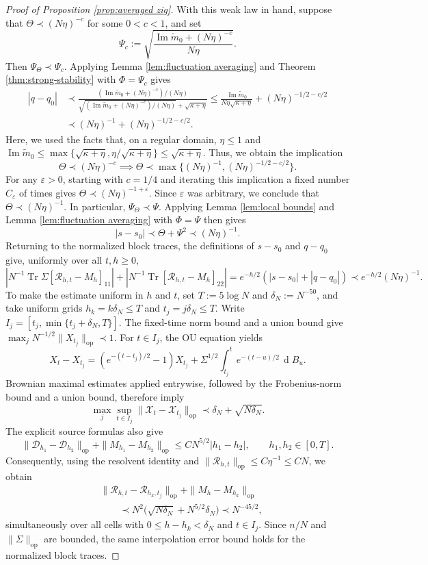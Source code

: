 \documentclass[11pt,reqno]{amsart}
\def\cX{\mathcal{X}}
\def\cR{\mathcal{R}}
\def\cD{\mathcal{D}}
\def\de{\operatorname{d}}
\def\Im{\operatorname{Im}}
\def\op{\mathrm{op}}
\def\eps{\varepsilon}
\def\Tr{\operatorname{Tr}}
\theoremstyle{definition}
\numberwithin{equation}{section}
\numberwithin{figure}{section}
\begin{document}
\begin{proof}[Proof of Proposition \ref{prop:averaged zig}]
With this weak law in hand, suppose that $\Theta\prec (N\eta)^{-c}$ for some $0<c<1$, and set
\[
    \Psi_c:=\sqrt{\frac{\Im\widetilde m_0+(N\eta)^{-c}}{N\eta}}.
\]
Then $\Psi_\Theta\prec\Psi_c$. Applying Lemma \ref{lem:fluctuation averaging} and Theorem \ref{thm:strong-stability} with $\Phi=\Psi_c$ gives
\begin{align*}
    |q-q_0|&\prec \frac{(\Im\widetilde m_0+(N\eta)^{-c})/(N\eta)}{\sqrt{(\Im\widetilde m_0+(N\eta)^{-c})/(N\eta)}+\sqrt{\kappa+\eta}}\leq \frac{\Im\widetilde m_0}{N\eta\sqrt{\kappa+\eta}}+(N\eta)^{-1/2-c/2}\\
    &\prec (N\eta)^{-1}+(N\eta)^{-1/2-c/2}.
\end{align*}
Here, we used the facts that, on a regular domain, $\eta\leq 1$ and $\Im\widetilde m_0\leq \max\{\sqrt{\kappa+\eta},\eta/\sqrt{\kappa+\eta}\}\leq \sqrt{\kappa+\eta}$. Thus, we obtain the implication
\[
    \Theta\prec (N\eta)^{-c}\implies \Theta\prec \max\{(N\eta)^{-1},(N\eta)^{-1/2-c/2}\}.
\]
For any $\eps>0$, starting with $c=1/4$ and iterating this implication a fixed number $C_\eps$ of times gives $\Theta\prec (N\eta)^{-1+\eps}$. Since $\eps$ was arbitrary, we conclude that $\Theta\prec (N\eta)^{-1}$. In particular, $\Psi_\Theta\prec\Psi$. Applying Lemma \ref{lem:local bounds} and Lemma \ref{lem:fluctuation averaging} with $\Phi=\Psi$ then gives
\[
    |s-s_0|\prec \Theta+\Psi^2\prec (N\eta)^{-1}.
\]
Returning to the normalized block traces, the definitions of $s-s_0$ and $q-q_0$ give, uniformly over all $t,h\geq 0$,
\[
    |N^{-1}\Tr\Sigma[\cR_{h,t}-M_h]_{11}|+|N^{-1}\Tr[\cR_{h,t}-M_h]_{22}|=e^{-h/2}(|s-s_0|+|q-q_0|)\prec e^{-h/2}(N\eta)^{-1}.
\]
To make the estimate uniform in $h$ and $t$, set
$T:=5\log N$ and $\delta_N:=N^{-50}$, and take uniform grids
$h_k=k\delta_N\leq T$ and $t_j=j\delta_N\leq T$.
Write $I_j=[t_j,\min\{t_j+\delta_N,T\}]$.
The fixed-time norm bound and a union bound give
$\max_jN^{-1/2}\|X_{t_j}\|_\op\prec1$.
For $t\in I_j$, the OU equation yields
\[
    X_t-X_{t_j}
    =(e^{-(t-t_j)/2}-1)X_{t_j}
    +\Sigma^{1/2}\int_{t_j}^{t}e^{-(t-u)/2}\,\de B_u.
\]
Brownian maximal estimates applied entrywise, followed by the
Frobenius-norm bound and a union bound, therefore imply
\[
    \max_j\sup_{t\in I_j}
    \|\cX_t-\cX_{t_j}\|_\op
    \prec \delta_N+\sqrt{N\delta_N}.
\]
The explicit source formulas also give
\[
    \|\cD_{h_1}-\cD_{h_2}\|_\op
    +\|M_{h_1}-M_{h_2}\|_\op
    \leq CN^{5/2}|h_1-h_2|,
    \qquad h_1,h_2\in[0,T].
\]
Consequently, using the resolvent identity and
$\|\cR_{h,t}\|_\op\leq C\eta^{-1}\leq CN$, we obtain
\begin{align*}
    &\|\cR_{h,t}-\cR_{h_k,t_j}\|_\op+\|M_h-M_{h_k}\|_\op\\
    &\qquad\prec
    N^2\bigl(\sqrt{N\delta_N}+N^{5/2}\delta_N\bigr)
    \prec N^{-45/2},
\end{align*}
simultaneously over all cells with
$0\leq h-h_k<\delta_N$ and $t\in I_j$.
Since $n/N$ and $\|\Sigma\|_\op$ are bounded, the same
interpolation error bound holds for the normalized block traces.


\end{proof}
\end{document}
